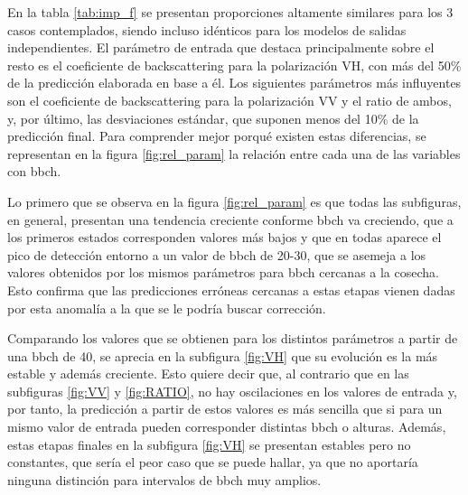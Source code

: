 \par En la tabla \ref{tab:imp_f} se presentan proporciones altamente similares para los 3 casos contemplados, siendo incluso idénticos para los modelos de salidas independientes. El parámetro de entrada que destaca principalmente sobre el resto es el coeficiente de backscattering para la polarización VH, con más del 50\% de la predicción elaborada en base a él. Los siguientes parámetros más influyentes son el coeficiente de backscattering para la polarización VV y el ratio de ambos, y, por último, las desviaciones estándar, que suponen menos del 10\% de la predicción final. Para comprender mejor porqué existen estas diferencias, se representan en la figura \ref{fig:rel_param} la relación entre cada una de las variables con \gls{bbch}.
\\
\par Lo primero que se observa en la figura \ref{fig:rel_param} es que todas las subfiguras, en general, presentan una tendencia creciente conforme \gls{bbch} va creciendo, que a los primeros estados corresponden valores más bajos y que en todas aparece el pico de detección entorno a un valor de \gls{bbch} de 20-30, que se asemeja a los valores obtenidos por los mismos parámetros para \gls{bbch} cercanas a la cosecha. Esto confirma que las predicciones erróneas cercanas a estas etapas vienen dadas por esta anomalía a la que se le podría buscar corrección. 
\\
\par Comparando los valores que se obtienen para los distintos parámetros a partir de una \gls{bbch} de 40, se aprecia en la subfigura \ref{fig:VH} que su evolución es la más estable y además creciente. Esto quiere decir que, al contrario que en las subfiguras \ref{fig:VV} y \ref{fig:RATIO}, no hay oscilaciones en los valores de entrada y, por tanto, la predicción a partir de estos valores es más sencilla que si para un mismo valor de entrada pueden corresponder distintas \gls{bbch} o alturas. Además, estas etapas finales en la subfigura \ref{fig:VH} se presentan estables pero no constantes, que sería el peor caso que se puede hallar, ya que no aportaría ninguna distinción para intervalos de \gls{bbch} muy amplios. 

